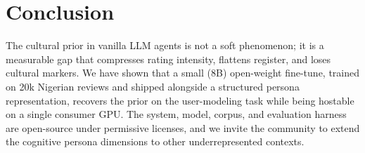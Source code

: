 \documentclass[sigconf,nonacm,balance]{acmart}
\begin{document}
\section{Conclusion}

The cultural prior in vanilla LLM agents is not a soft phenomenon; it is a
measurable gap that compresses rating intensity, flattens register, and
loses cultural markers. We have shown that a small (8B) open-weight fine-tune,
trained on 20k Nigerian reviews and shipped alongside a structured persona
representation, recovers the prior on the user-modeling task while being
hostable on a single consumer GPU. The system, model, corpus, and evaluation
harness are open-source under permissive licenses, and we invite the community
to extend the cognitive persona dimensions to other underrepresented contexts.



\end{document}
